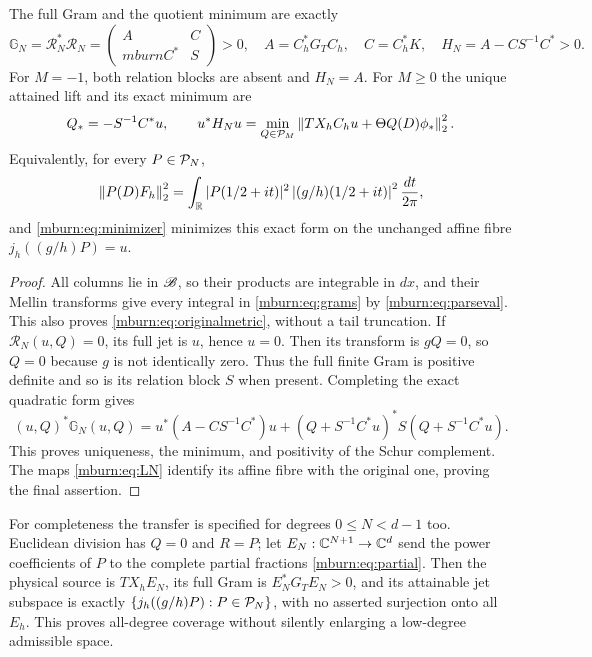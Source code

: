 \documentclass[11pt]{article}
\begin{document}
\begin{mburntheorem}
\label{mburn:thm:gram}
The full Gram and the quotient minimum are exactly
\begin{equation}\label{mburn:eq:schur}
 \mathbb G_N=\mathcal R_N^*\mathcal R_N
   =\begin{pmatrix}A&C\\mburnC^*&S\end{pmatrix}>0,
 \quad A=C_h^*G_TC_h,\quad C=C_h^*K,\quad
 H_N=A-CS^{-1}C^*>0.
\end{equation}
For $M=-1$, both relation blocks are absent and $H_N=A$.
For $M\geq0$ the unique attained lift and its exact minimum are
\begin{equation}\label{mburn:eq:minimizer}
 Q_*=-S^{-1}C^*u,\qquad
 u^*H_Nu=\min_{Q\in\mathcal P_M}
          \left\lVert T X_hC_hu+\Theta Q(D)\phi_*\right\rVert_2^2.
\end{equation}
Equivalently, for every $P\in\mathcal P_N$,
\begin{equation}\label{mburn:eq:originalmetric}
 \left\lVert P(D)F_h\right\rVert_2^2
  =\int_\mathbb R|P(1/2+it)|^2\left|(g/h)(1/2+it)\right|^2
                                                   \frac{dt}{2\pi},
\end{equation}
and \eqref{mburn:eq:minimizer} minimizes this exact form on the
unchanged affine fibre $j_h((g/h)P)=u$.
\end{mburntheorem}
\begin{proof}
All columns lie in $\mathscr B$, so their products are integrable
in $dx$, and their Mellin transforms give every integral in
\eqref{mburn:eq:grams} by \eqref{mburn:eq:parseval}. This also proves
\eqref{mburn:eq:originalmetric}, without a tail truncation.
If $\mathcal R_N(u,Q)=0$, its full jet is $u$, hence $u=0$.
Then its transform is $gQ=0$, so $Q=0$ because $g$ is not
identically zero. Thus the full finite Gram is positive
definite and so is its relation block $S$ when present.
Completing the exact quadratic form gives
\[
 (u,Q)^*\mathbb G_N(u,Q)
 =u^*(A-CS^{-1}C^*)u
       +(Q+S^{-1}C^*u)^*S(Q+S^{-1}C^*u).
\]
This proves uniqueness, the minimum, and positivity of the
Schur complement. The maps \eqref{mburn:eq:LN} identify its affine
fibre with the original one, proving the final assertion.
\end{proof}

For completeness the transfer is specified for degrees
$0\leq N<d-1$ too. Euclidean division has $Q=0$ and $R=P$;
let $E_N:\mathbb C^{N+1}\to\mathbb C^d$ send the power coefficients of
$P$ to the complete partial fractions \eqref{mburn:eq:partial}.
Then the physical source is $TX_hE_N$, its full Gram is
$E_N^*G_TE_N>0$, and its attainable jet subspace is exactly
$\{j_h((g/h)P):P\in\mathcal P_N\}$, with no asserted surjection
onto all $E_h$. This proves all-degree coverage without
silently enlarging a low-degree admissible space.
\end{document}
